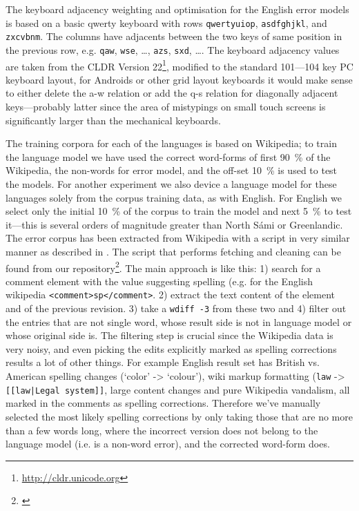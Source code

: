 \documentclass[a4paper,12pt]{article}
\begin{document}
The keyboard adjacency weighting and optimisation for the English error models
is based on a basic qwerty keyboard with rows \texttt{qwertyuiop},
\texttt{asdfghjkl}, and \texttt{zxcvbnm}. The columns have adjacents between
the two keys of same position in the previous row, e.g. \texttt{qaw},
\texttt{wse}, \ldots, \texttt{azs}, \texttt{sxd}, \ldots.  The keyboard
adjacency values are taken from the CLDR Version
22\footnote{\url{http://cldr.unicode.org}}, modified to the standard 101---104
key PC keyboard layout, for Androids or other grid layout keyboards it would
make sense to either delete the a-w relation or add the q-s relation for
diagonally adjacent keys---probably latter since the area of mistypings on
small touch screens is significantly larger than the mechanical keyboards.

The training corpora for each of the languages is based on Wikipedia; to train
the language model we have used the correct word-forms of first 90~\% of the
Wikipedia, the non-words for error model, and the off-set 10~\% is used to test
the models. For another experiment we also device a language model for these
languages solely from the corpus training data, as with English.  For English
we select only the initial 10~\% of the corpus to train the model and next 5~\%
to test it---this is several orders of magnitude greater than North Sámi or
Greenlandic. The error corpus has been extracted from Wikipedia with a script
in very similar manner as described in \cite{max2010mining}. The script that
performs fetching and cleaning can be found from our
repository\footnote{\url{}}. The main approach is like this: 1) search for a
comment element with the value suggesting spelling (e.g. for the English
wikipedia \texttt{<comment>sp</comment>}. 2) extract the text content of the
element and of the previous revision. 3) take a \texttt{wdiff -3} from these
two and 4) filter out the entries that are not single word, whose result side
is not in language model or whose original side is.  The filtering step is
crucial since the Wikipedia data is very noisy, and even picking the edits
explicitly marked as spelling corrections results a lot of other things. For
example English result set has British vs.  American spelling changes (`color'
-> `colour'), wiki markup formatting (\texttt{law} -> \texttt{[[law|Legal
system]]}, large content changes and pure Wikipedia vandalism, all marked in
the comments as spelling corrections. Therefore we've manually selected the
most likely spelling corrections by only taking those that are no more than a
few words long, where the incorrect version does not belong to the language
model (i.e.  is a non-word error), and the corrected word-form does.
\end{document}
